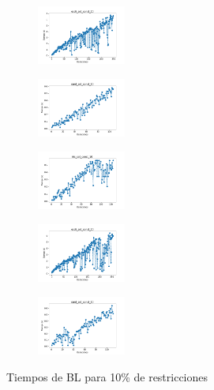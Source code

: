 \begin{figure}[H]
\begin{subfigure}
    \end{subfigure}
    \hfill
    \begin{subfigure}
        \centering
        \includegraphics[width=0.32\textwidth]{img/bl/ecoli_set_const_10_49258669_time.png}
    \end{subfigure}
    \hfill
    \begin{subfigure}
        \centering
        \includegraphics[width=0.32\textwidth]{img/bl/rand_set_const_10_49258669_time.png}
    \end{subfigure}
    \hfill
    \begin{subfigure}
        \centering
        \includegraphics[width=0.32\textwidth]{img/bl/iris_set_const_10_3773969821_time.png}
    \end{subfigure}
    \hfill
    \begin{subfigure}
        \centering
        \includegraphics[width=0.32\textwidth]{img/bl/ecoli_set_const_10_3773969821_time.png}
    \end{subfigure}
    \hfill
    \begin{subfigure}
        \centering
        \includegraphics[width=0.32\textwidth]{img/bl/rand_set_const_10_3773969821_time.png}
    \end{subfigure}
    \caption{Tiempos de BL para 10\% de restricciones}
\end{figure}

